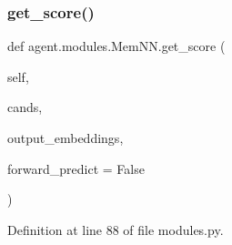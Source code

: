 \subsubsection{\texorpdfstring{get\+\_\+score()}{get\_score()}}
{\footnotesize\ttfamily def agent.\+modules.\+Mem\+N\+N.\+get\+\_\+score (\begin{DoxyParamCaption}\item[{}]{self,  }\item[{}]{cands,  }\item[{}]{output\+\_\+embeddings,  }\item[{}]{forward\+\_\+predict = {\ttfamily False} }\end{DoxyParamCaption})}



Definition at line 88 of file modules.\+py.



